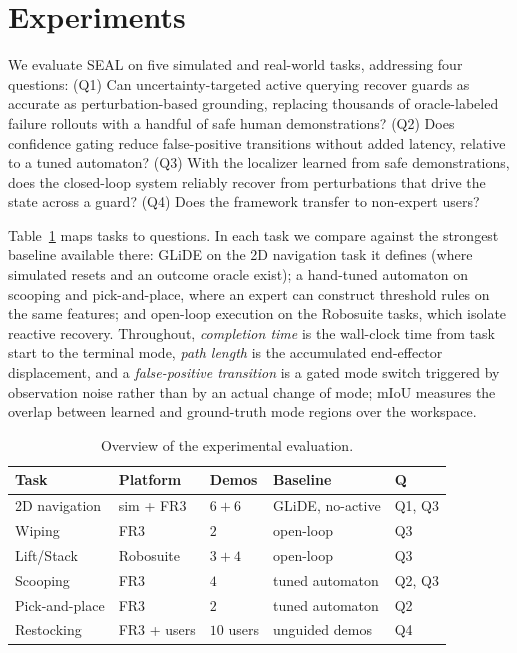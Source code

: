 \section{Experiments}
\label{sec:experiments}
We evaluate SEAL on five simulated and real-world tasks, addressing four questions: (Q1) Can uncertainty-targeted active querying recover guards as accurate as perturbation-based grounding, replacing thousands of oracle-labeled failure rollouts with a handful of safe human demonstrations? (Q2) Does confidence gating reduce false-positive transitions without added latency, relative to a tuned automaton? (Q3) With the localizer learned from safe demonstrations, does the closed-loop system reliably recover from perturbations that drive the state across a guard? (Q4) Does the framework transfer to non-expert users?

Table~\ref{tab:exp_overview} maps tasks to questions. In each task we compare against the strongest baseline available there: GLiDE on the 2D navigation task it defines (where simulated resets and an outcome oracle exist); a hand-tuned automaton on scooping and pick-and-place, where an expert can construct threshold rules on the same features; and open-loop execution on the Robosuite tasks, which isolate reactive recovery. Throughout, \emph{completion time} is the wall-clock time from task start to the terminal mode, \emph{path length} is the accumulated end-effector displacement, and a \emph{false-positive transition} is a gated mode switch triggered by observation noise rather than by an actual change of mode; mIoU measures the overlap between learned and ground-truth mode regions over the workspace.

\begin{table}[t]
\centering
\caption{Overview of the experimental evaluation.}
\label{tab:exp_overview}
\setlength{\tabcolsep}{3.5pt}
\begin{tabular}{lllll}
\toprule
\textbf{Task} & \textbf{Platform} & \textbf{Demos} & \textbf{Baseline} & \textbf{Q} \\
\midrule
2D navigation & sim + FR3 & $6{+}6$ & GLiDE, no-active & Q1, Q3 \\
Wiping & FR3 & $2$ & open-loop & Q3 \\
Lift/Stack & Robosuite & $3{+}4$ & open-loop & Q3 \\
Scooping & FR3 & $4$ & tuned automaton & Q2, Q3 \\
Pick-and-place & FR3 & $2$ & tuned automaton & Q2 \\
Restocking & FR3 + users & $10$ users & unguided demos & Q4 \\
\bottomrule
\end{tabular}
\end{table}

